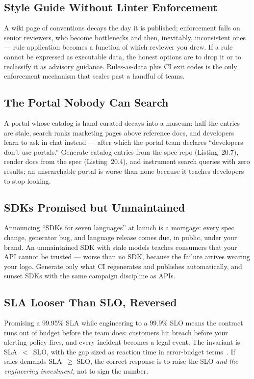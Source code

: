 \subsection{Style Guide Without Linter Enforcement}
\label{pit:noenforce}
A wiki page of conventions decays the day it is published; enforcement
falls on senior reviewers, who become bottlenecks and then, inevitably,
inconsistent ones --- rule application becomes a function of which
reviewer you drew. If a rule cannot be expressed as executable data, the
honest options are to drop it or to reclassify it as advisory guidance.
Rules-as-data plus CI exit codes is the only enforcement mechanism that
scales past a handful of teams.

\subsection{The Portal Nobody Can Search}
\label{pit:portal}
A portal whose catalog is hand-curated decays into a museum: half the
entries are stale, search ranks marketing pages above reference docs, and
developers learn to ask in chat instead --- after which the portal team
declares ``developers don't use portals.'' Generate catalog entries from
the spec repo (Listing~20.7), render docs from the spec (Listing~20.4),
and instrument search queries with zero results; an unsearchable portal
is worse than none because it teaches developers to stop looking.

\subsection{SDKs Promised but Unmaintained}
\label{pit:sdk}
Announcing ``SDKs for seven languages'' at launch is a mortgage: every
spec change, generator bug, and language release comes due, in public,
under your brand. An unmaintained SDK with stale models teaches consumers
that your API cannot be trusted --- worse than no SDK, because the failure
arrives wearing your logo. Generate only what CI regenerates and
publishes automatically, and sunset SDKs with the same campaign
discipline as APIs.

\subsection{SLA Looser Than SLO, Reversed}
\label{pit:sla}
Promising a 99.95\% SLA while engineering to a 99.9\% SLO means the
contract runs out of budget before the team does: customers hit breach
before your alerting policy fires, and every incident becomes a legal
event. The invariant is SLA~$<$~SLO, with the gap sized as reaction time
in error-budget terms~\cite{beyer2016sre}. If sales demands SLA~$\geq$
SLO, the correct response is to raise the SLO \emph{and the engineering
investment}, not to sign the number.

